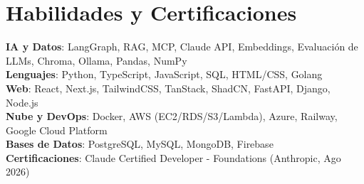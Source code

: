 \documentclass[letterpaper,11pt]{article}
\begin{document}
\section{Habilidades y Certificaciones}
 \begin{itemize}[leftmargin=0.15in, label={}]
    \small{\item{
     \textbf{IA y Datos}{: LangGraph, RAG, MCP, Claude API, Embeddings, Evaluación de LLMs, Chroma, Ollama, Pandas, NumPy} \\
     \textbf{Lenguajes}{: Python, TypeScript, JavaScript, SQL, HTML/CSS, Golang} \\
     \textbf{Web}{: React, Next.js, TailwindCSS, TanStack, ShadCN, FastAPI, Django, Node.js} \\
     \textbf{Nube y DevOps}{: Docker, AWS (EC2/RDS/S3/Lambda), Azure, Railway, Google Cloud Platform} \\
     \textbf{Bases de Datos}{: PostgreSQL, MySQL, MongoDB, Firebase} \\
     \textbf{Certificaciones}{: Claude Certified Developer - Foundations (Anthropic, Ago 2026)}
    }}
 \end{itemize}


\end{document}
